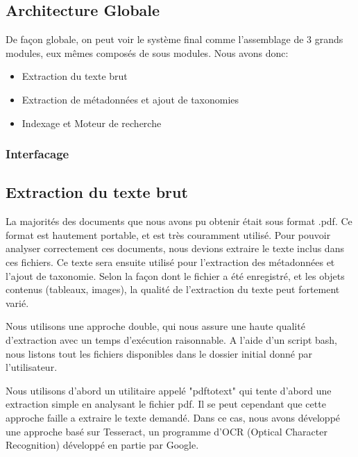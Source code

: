 

\subsection{Architecture Globale}
De façon globale, on peut voir le système final comme l'assemblage de 3 grands modules, eux mêmes composés de sous modules. 
Nous avons donc:
\begin{itemize}
	\item Extraction du texte brut
	\item Extraction de métadonnées et ajout de taxonomies
	\item Indexage et Moteur de recherche
\end{itemize}

\subsubsection{Interfacage}

\subsection{Extraction du texte brut}
La majorités des documents que nous avons pu obtenir était sous format .pdf.
Ce format est hautement portable, et est très couramment utilisé.
Pour pouvoir analyser correctement ces documents, nous devions extraire le texte inclus dans ces fichiers.
Ce texte sera ensuite utilisé pour l'extraction des métadonnées et l'ajout de taxonomie. Selon la façon dont le fichier a été enregistré, et les objets contenus (tableaux, images), la qualité de l'extraction du texte peut fortement varié. 

Nous utilisons une approche double, qui nous assure une haute qualité d'extraction avec un temps d'exécution raisonnable.
A l'aide d'un script bash, nous listons tout les fichiers disponibles dans le dossier initial donné par l'utilisateur. 

Nous utilisons d'abord un utilitaire appelé "pdftotext" qui tente d'abord une extraction simple en analysant le fichier pdf.
Il se peut cependant que cette approche faille a extraire le texte demandé.
Dans ce cas, nous avons développé une approche basé sur Tesseract, un programme d'OCR (Optical Character Recognition) développé en partie par Google. 

